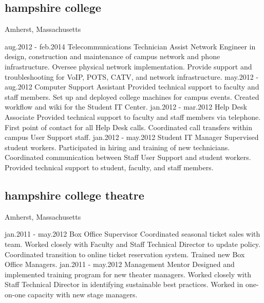\documentclass[]{friggeri-cv} %
\begin{document}
\subsection
{hampshire college}
{Amherst, Massachusetts}

\begin{entrylist}
\entry
{aug.2012 - feb.2014}
{Telecommunications Technician}{}
{Assist Network Engineer in design, construction and maintenance of campus network and phone infrastructure. Oversee physical network implementation. Provide support and troubleshooting for VoIP, POTS, CATV, and network infrastructure.}
\entry
{may.2012 - aug.2012}
{Computer Support Assistant}{}
{Provided technical support to faculty and staff members. Set up and deployed college machines for campus events. Created workflow and wiki for the Student IT Center.}
\entry
{jan.2012 - mar.2012}
{Help Desk Associate}{}
{Provided technical support to faculty and staff members via telephone. First point of contact for all Help Desk calls. Coordinated call transfers within campus User Support staff.}
\entry
{jan.2012 - may.2012}
{Student IT Manager}{}
{Supervised student workers. Participated in hiring and training of new technicians. Coordinated communication between Staff User Support and student workers. Provided technical support to student, faculty, and staff members.}
\end{entrylist}


\subsection
{hampshire college theatre}
{Amherst, Massachusetts}

\begin{entrylist}
\entry
{jan.2011 - may.2012}
{Box Office Supervisor}{}
{Coordinated seasonal ticket sales with team. Worked closely with Faculty and Staff Technical Director to update policy. Coordinated transition to online ticket reservation system. Trained new Box Office Managers.}
\entry
{jan.2011 - may.2012}
{Management Mentor}{}
{Designed and implemented training program for new theater managers. Worked closely with Staff Technical Director in identifying sustainable best practices. Worked in one-on-one capacity with new stage managers.}
\end{entrylist}
\end{document}
